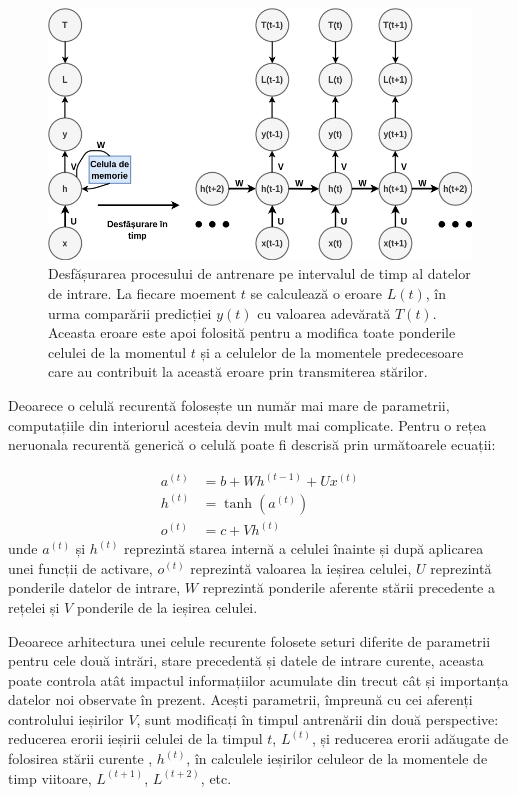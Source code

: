 \documentclass[a4paper,12pt]{book}
\begin{document}
				\begin{figure}[h]
					\centering
					\includegraphics[scale=0.6]{rnn_layer}
					\caption{Desfășurarea procesului de antrenare pe intervalul de timp al datelor de intrare. La fiecare moement $t$ se calculează o eroare $L(t)$, în urma comparării predicției $y(t)$ cu valoarea adevărată $T(t)$. Aceasta eroare este apoi folosită pentru a modifica toate ponderile celulei de la momentul $t$ și a celulelor de la momentele predecesoare care au contribuit la această eroare prin transmiterea stărilor.
					}
					\label{fig:rnn_layer}
				\end{figure} 
					Deoarece o celulă recurentă folosește un număr mai mare de parametrii, computațiile din interiorul acesteia devin mult mai complicate. Pentru o rețea neruonala recurentă generică o celulă poate fi descrisă prin următoarele ecuații:
				
				\begin{align}
					a^{(t)} &= b + Wh^{(t-1)} + Ux^{(t)} \\ \label{rnn_states}
					h^{(t)} &= \tanh{(a^{(t)})}\\
					o^{(t)} &= c + Vh^{(t)}	
				\end{align}
				unde $a^{(t)}$ și $h^{(t)}$ reprezintă starea internă a celulei înainte și după aplicarea unei funcții de activare, $o^{(t)}$ reprezintă valoarea la ieșirea celulei, $U$ reprezintă ponderile datelor de intrare, $W$ reprezintă ponderile aferente stării precedente a rețelei și $V$ ponderile de la ieșirea celulei. \par
				
				Deoarece arhitectura unei celule recurente folosete seturi diferite de parametrii pentru cele două intrări, stare precedentă și datele de intrare curente, aceasta poate controla atât impactul informațiilor acumulate din trecut cât și importanța datelor noi observate în prezent. Acești parametrii, împreună cu cei aferenți controlului ieșirilor $V$,  sunt modificați în timpul antrenării din două perspective: reducerea erorii ieșirii celulei de la timpul $t$, $L^{(t)}$,  și reducerea erorii adăugate de folosirea stării curente , $h^{(t)}$, în calculele ieșirilor celuleor de la momentele de timp viitoare, $L^{(t+1)}$, $L^{(t+2)}$, etc. \par
				
\end{document}
